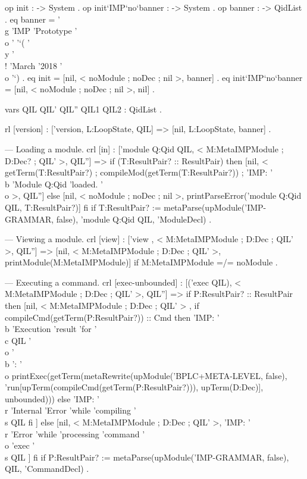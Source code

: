 \documentclass{llncs}%
\begin{document}
        op init : -> System .
    op init`IMP`no`banner : -> System .
    op banner : -> QidList .
    eq banner = '\\g 'IMP 'Prototype '\\o ' '`( '\\y '\\! 'March '2018 '\\o '`) .
    eq init = [nil, < noModule ; noDec ; nil >, banner] .
    eq init`IMP`no`banner = [nil, < noModule ; noDec ; nil >, nil] .

    vars QIL QIL' QIL'' QIL1 QIL2 : QidList .

    rl [version] : ['version, L:LoopState, QIL] => [nil, L:LoopState, banner] .

    --- Loading a module.
    crl [in] : ['module Q:Qid QIL, < M:MetaIMPModule ; D:Dec? ; QIL' >, QIL''] =>
        if (T:ResultPair? :: ResultPair)
        then [nil, < getTerm(T:ResultPair?) ;
                                         compileMod(getTerm(T:ResultPair?)) ;
                                         'IMP: '\\b 'Module Q:Qid 'loaded. '\\o  >, QIL'']
        else [nil, < noModule ; noDec ; nil >,
                  printParseError('module Q:Qid QIL, T:ResultPair?)]
        fi
    if T:ResultPair? :=
           metaParse(upModule('IMP-GRAMMAR, false), 'module Q:Qid QIL, 'ModuleDecl) .

        --- Viewing a module.
    crl [view] : ['view , < M:MetaIMPModule ; D:Dec ; QIL' >, QIL''] =>
                     [nil, < M:MetaIMPModule ; D:Dec ; QIL' >,
                                  printModule(M:MetaIMPModule)]
    if M:MetaIMPModule =/= noModule .

    --- Executing a command.
    crl [exec-unbounded] : [('exec QIL), < M:MetaIMPModule ; D:Dec ; QIL' >, QIL''] =>
        if P:ResultPair? :: ResultPair
        then [nil, < M:MetaIMPModule ; D:Dec ; QIL' > ,
            if compileCmd(getTerm(P:ResultPair?)) :: Cmd
            then
                          'IMP: '\\b 'Execution 'result 'for '\\c QIL '\\o '\\b ': '\\o
                          printExec(getTerm(metaRewrite(upModule('BPLC+META-LEVEL, false),
                           'run[upTerm(compileCmd(getTerm(P:ResultPair?))), upTerm(D:Dec)], unbounded)))
            else 'IMP: '\\r 'Internal 'Error 'while 'compiling '\\s QIL
            fi ]
        else [nil, < M:MetaIMPModule ; D:Dec ; QIL' >,
                  'IMP: '\\r 'Error 'while 'processing 'command '\\o 'exec '\\s QIL ]
        fi
    if P:ResultPair? :=
           metaParse(upModule('IMP-GRAMMAR, false), QIL, 'CommandDecl) .
\end{document}
